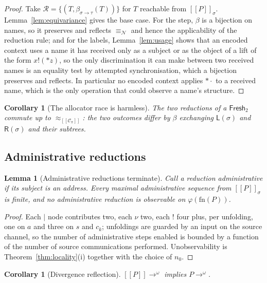 \documentclass[11pt]{article}
\theoremstyle{definition}
\theoremstyle{plain}
\newtheorem{lemma}[definition]{Lemma}
\newtheorem{corollary}[definition]{Corollary}
\theoremstyle{remark}
\newcommand{\drp}[1]{{*}#1}
\newcommand{\out}[2]{#1!(#2)}
\newcommand{\enc}[1]{[\![#1]\!]}
\newcommand{\nequiv}{\equiv_{\mathcal{N}}}
\newcommand{\Lft}{\mathsf{L}}
\newcommand{\Rgt}{\mathsf{R}}
\newcommand{\Frsh}{\mathsf{Fresh}_2}
\newcommand{\Ctx}{\mathscr{C}}
\newcommand{\bisim}{\approx}
\newcommand{\fn}{\mathrm{fn}}
\begin{document}
\begin{proof}
Take $\mathcal{R} = \{(T, \beta_{\sigma\to\tau}(T))\}$ for $T$ reachable
from $\enc{P}_\sigma$. Lemma~\ref{lem:equivariance} gives the base case.
For the step, $\beta$ is a bijection on names, so it preserves and
reflects $\nequiv$ and hence the applicability of the reduction rule;
and for the labels, Lemma~\ref{lem:usage} shows that an encoded context
uses a name it has received only as a subject or as the object of a lift
of the form $\out{x}{\drp{z}}$, so the only discrimination it can make
between two received names is an equality test by attempted
synchronisation, which a bijection preserves and reflects. In particular
no encoded context applies $\drp{\cdot}$ to a received name, which is the
only operation that could observe a name's structure.
\end{proof}

\begin{corollary}[The allocator race is harmless]\label{cor:race}
The two reductions of a $\Frsh$ commute up to
$\bisim_{\enc{\Ctx_\pi}}$: the two outcomes differ by
$\beta$ exchanging $\Lft(\sigma)$ and $\Rgt(\sigma)$ and their subtrees.
\end{corollary}

\subsection{Administrative reductions}

\begin{lemma}[Administrative reductions terminate]\label{lem:admin}
Call a reduction \emph{administrative} if its subject is an address.
Every maximal administrative sequence from $\enc{P}_\sigma$ is finite, and
no administrative reduction is observable on $\varphi(\fn(P))$.
\end{lemma}

\begin{proof}
Each $\mid$ node contributes two, each $\nu$ two, each $!$ four plus, per
unfolding, one on $a$ and three on $s$ and $c_k$; unfoldings are guarded
by an input on the source channel, so the number of administrative steps
enabled is bounded by a function of the number of source communications
performed. Unobservability is Theorem~\ref{thm:locality}(i) together with
the choice of $n_0$.
\end{proof}

\begin{corollary}[Divergence reflection]
$\enc{P} \to^{\omega}$ implies $P \to^{\omega}$.
\end{corollary}
\end{document}
